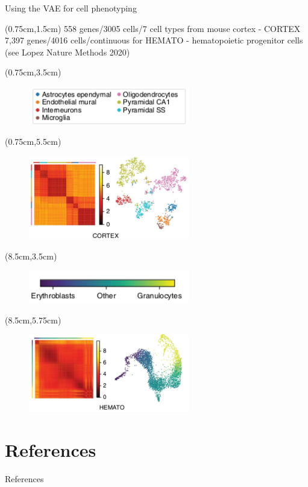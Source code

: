 \documentclass[aspectratio=1610]{beamer}					%
\begin{document}
\begin{frame}{Using the VAE for cell phenotyping}

\begin{textblock*}{15cm}(0.75cm,1.5cm)
558 genes/3005 cells/7 cell types from mouse cortex - CORTEX\\
\vspace{0.1in}
7,397 genes/4016 cells/continuous for HEMATO - hematopoietic progenitor cells (see Lopez Nature Methods 2020)\\
\end{textblock*}
\begin{textblock*}{7cm}(0.75cm,3.5cm)
\begin{figure}
\includegraphics[width=7cm]{cortex-legend.png}
\end{figure}
\end{textblock*}
\begin{textblock*}{7cm}(0.75cm,5.5cm)
\begin{figure}
\includegraphics[width=7cm]{cortex.png}
\end{figure}
\end{textblock*}
\begin{textblock*}{7cm}(8.5cm,3.5cm)
\begin{figure}
\includegraphics[width=7cm]{hemato-legend.png}
\end{figure}
\end{textblock*}
\begin{textblock*}{7cm}(8.5cm,5.75cm)
\begin{figure}
\includegraphics[width=7cm]{hemato.png}
\end{figure}
\end{textblock*}
\end{frame}

\section{References}

\begin{frame}[allowframebreaks]{References}
	\tiny
	
\end{frame}
\end{document}
